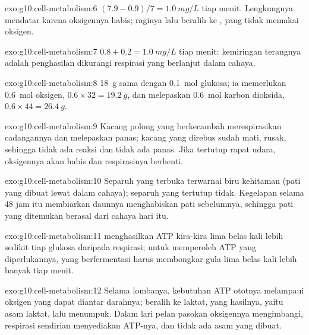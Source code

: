 \begin{solution}{exo:g10:cell-metabolism:6}
$(7.9 - 0.9)/7 = \qty{1.0}{mg/L}$ tiap menit. Lengkungnya mendatar
karena oksigennya habis; raginya lalu beralih ke , yang tidak
memakai oksigen.
\end{solution}

\begin{solution}{exo:g10:cell-metabolism:7}
$0.8 + 0.2 = \qty{1.0}{mg/L}$ tiap menit: kemiringan terangnya adalah
penghasilan dikurangi respirasi yang berlanjut dalam cahaya.
\end{solution}

\begin{solution}{exo:g10:cell-metabolism:8}
\qty{18}{g} sama dengan \qty{0.1}{mol} glukosa; ia memerlukan
\qty{0.6}{mol} oksigen, $0.6 \times 32 = \qty{19.2}{g}$, dan
melepaskan \qty{0.6}{mol} karbon dioksida, $0.6 \times 44 = \qty{26.4}{g}$.
\end{solution}

\begin{solution}{exo:g10:cell-metabolism:9}
Kacang polong yang berkecambah merespirasikan cadangannya dan
melepaskan panas; kacang yang direbus sudah mati,  rusak,
sehingga tidak ada reaksi dan tidak ada panas. Jika tertutup rapat
udara, oksigennya akan habis dan respirasinya berhenti.
\end{solution}

\begin{solution}{exo:g10:cell-metabolism:10}
Separuh yang terbuka terwarnai biru kehitaman (pati yang dibuat lewat
 dalam cahaya); separuh yang tertutup tidak. Kegelapan
selama 48 jam itu membiarkan daunnya menghabiskan pati sebelumnya,
sehingga pati yang ditemukan berasal dari cahaya hari itu.
\end{solution}

\begin{solution}{exo:g10:cell-metabolism:11}
 menghasilkan ATP kira-kira lima belas kali lebih sedikit
tiap glukosa daripada respirasi; untuk memperoleh ATP yang
diperlukannya,  yang berfermentasi harus membongkar gula lima belas
kali lebih banyak tiap menit.
\end{solution}

\begin{solution}{exo:g10:cell-metabolism:12}
Selama lombanya, kebutuhan ATP ototnya melampaui oksigen yang dapat
diantar darahnya;  beralih ke  laktat, yang hasilnya,
yaitu asam laktat, lalu menumpuk. Dalam lari pelan pasokan oksigennya
mengimbangi, respirasi sendirian menyediakan ATP-nya, dan tidak ada
asam yang dibuat.
\end{solution}

